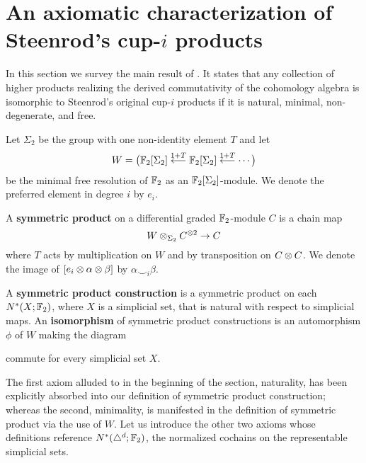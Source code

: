 
\section{An axiomatic characterization of Steenrod's cup-$i$ products}

In this section we survey the main result of \cite{medina2018axiomatic}. It states that any collection of higher products realizing the derived commutativity of the cohomology algebra is isomorphic to Steenrod's original cup-$i$ products if it is natural, minimal, non-degenerate, and free.

Let $\Sigma_2$ be the group with one non-identity element $T$ and let
\begin{equation} \label{equation: definition of W}
W = \big( {\mathbb{F}_2}[\Sigma_2] \stackrel{1+T}{\longleftarrow} {\mathbb{F}_2}[\Sigma_2] \stackrel{1+T}{\longleftarrow} \cdots \big)
\end{equation}
be the minimal free resolution of ${\mathbb{F}_2}$ as an ${\mathbb{F}_2}[\Sigma_2]$-module. We denote the preferred element in degree $i$ by $e_i$.

A \textbf{symmetric product} on a differential graded ${\mathbb{F}_2}$-module $C$ is a chain map
\begin{equation*}
W \otimes_{\Sigma_2} C^{\otimes 2} \to C
\end{equation*}
where $T$ acts by multiplication on $W$ and by transposition on $C \otimes C$. We denote the image of $[e_i \otimes \alpha \otimes \beta]$ by $\alpha \smallsmile_i \beta$.

A \textbf{symmetric product construction} is a symmetric product on each $N^*(X; {\mathbb{F}_2})$, where $X$ is a simplicial set, that is natural with respect to simplicial maps. An \textbf{isomorphism} of symmetric product constructions is an automorphism $\phi$ of $W$ making the diagram
\begin{center}
\end{center}
commute for every simplicial set $X$.

The first axiom alluded to in the beginning of the section, naturality, has been explicitly absorbed into our definition of symmetric product construction; whereas the second, minimality, is manifested in the definition of symmetric product via the use of $W$. Let us introduce the other two axioms whose definitions reference $N^*(\triangle^d; {\mathbb{F}_2})$, the normalized cochains on the representable simplicial sets.


